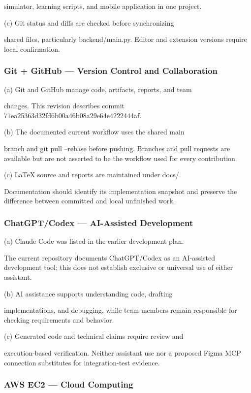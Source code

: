 \documentclass[conference]{IEEEtran}
\begin{document}
simulator, learning scripts, and mobile application in one project.

(c) Git status and diffs are checked before synchronizing

shared files, particularly backend/main.py. Editor and extension versions require local confirmation.

\subsubsection{Git + GitHub --- Version Control and Collaboration}

(a) Git and GitHub manage code, artifacts, reports, and team

changes. This revision describes commit 71ea25363d32fd6b00a46b08a29e64e4222444af.

(b) The documented current workflow uses the shared main

branch and git pull --rebase before pushing. Branches and pull requests are available but are not asserted to be the workflow used for every contribution.

(c) LaTeX source and reports are maintained under docs/.

Documentation should identify its implementation snapshot and preserve the difference between committed and local unfinished work.

\subsubsection{ChatGPT/Codex --- AI-Assisted Development}

(a) Claude Code was listed in the earlier development plan.

The current repository documents ChatGPT/Codex as an AI-assisted development tool; this does not establish exclusive or universal use of either assistant.

(b) AI assistance supports understanding code, drafting

implementations, and debugging, while team members remain responsible for checking requirements and behavior.

(c) Generated code and technical claims require review and

execution-based verification. Neither assistant use nor a proposed Figma MCP connection substitutes for integration-test evidence.

\subsubsection{AWS EC2 --- Cloud Computing \cite{ref14}}
\end{document}
